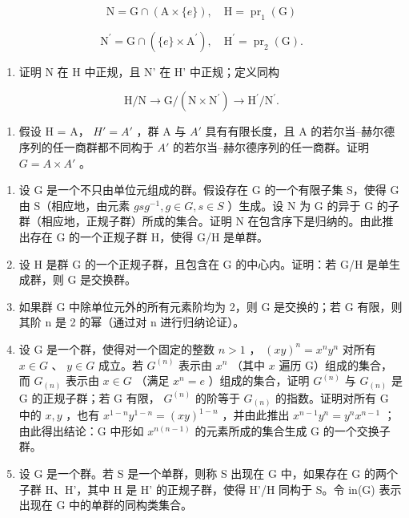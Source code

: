 \[
\mathrm{N} = \mathrm{G} \cap (\mathrm{A} \times \{e \}), \quad \mathrm{H} = \operatorname{pr} _ {1} (\mathrm{G})
\]

\[
\mathrm{N} ^ {\prime} = \mathrm{G} \cap (\{e \} \times \mathrm{A} ^ {\prime}), \quad \mathrm{H} ^ {\prime} = \operatorname{pr} _ {2} (\mathrm{G}).
\]

\begin{enumerate}
\def\labelenumi{(\alph{enumi})}
\tightlist
\item
  证明 N 在 H 中正规，且 N' 在 H' 中正规；定义同构
\end{enumerate}

\[
\mathrm{H} / \mathrm{N} \rightarrow \mathrm{G} / (\mathrm{N} \times \mathrm{N} ^ {\prime}) \rightarrow \mathrm{H} ^ {\prime} / \mathrm{N} ^ {\prime}.
\]

\begin{enumerate}
\def\labelenumi{(\alph{enumi})}
\setcounter{enumi}{1}
\tightlist
\item
  假设 H = A， \(H' = A'\) ，群 A 与 \(A'\) 具有有限长度，且 A 的若尔当–赫尔德序列的任一商群都不同构于 \(A'\) 的若尔当–赫尔德序列的任一商群。证明 \(G = A \times A'\) 。
\end{enumerate}

\begin{enumerate}
\def\labelenumi{\arabic{enumi}.}
\setcounter{enumi}{8}
\item
  设 G 是一个不只由单位元组成的群。假设存在 G 的一个有限子集 S，使得 G 由 S（相应地，由元素 \(gsg^{-1}, g \in G, s \in S\) ）生成。设 N 为 G 的异于 G 的子群（相应地，正规子群）所成的集合。证明 N 在包含序下是归纳的。由此推出存在 G 的一个正规子群 H，使得 G/H 是单群。
\item
  设 H 是群 G 的一个正规子群，且包含在 G 的中心内。证明：若 G/H 是单生成群，则 G 是交换群。
\item
  如果群 G 中除单位元外的所有元素阶均为 2，则 G 是交换的；若 G 有限，则其阶 n 是 2 的幂（通过对 n 进行归纳论证）。
\item
  设 G 是一个群，使得对一个固定的整数 \(n > 1\) ， \((xy)^n = x^n y^n\) 对所有 \(x \in G\) 、 \(y \in G\) 成立。若 \(G^{(n)}\) 表示由 \(x^n\) （其中 \(x\) 遍历 G）组成的集合，而 \(G_{(n)}\) 表示由 \(x \in G\) （满足 \(x^n = e\) ）组成的集合，证明 \(G^{(n)}\) 与 \(G_{(n)}\) 是 G 的正规子群；若 G 有限， \(G^{(n)}\) 的阶等于 \(G_{(n)}\) 的指数。证明对所有 G 中的 \(x, y\) ，也有 \(x^{1-n}y^{1-n} = (xy)^{1-n}\) ，并由此推出 \(x^{n-1}y^n = y^n x^{n-1}\) ；由此得出结论：G 中形如 \(x^{n(n-1)}\) 的元素所成的集合生成 G 的一个交换子群。
\item
  设 G 是一个群。若 S 是一个单群，则称 S 出现在 G 中，如果存在 G 的两个子群 H、H'，其中 H 是 H' 的正规子群，使得 H'/H 同构于 S。令 in(G) 表示出现在 G 中的单群的同构类集合。
\end{enumerate}

